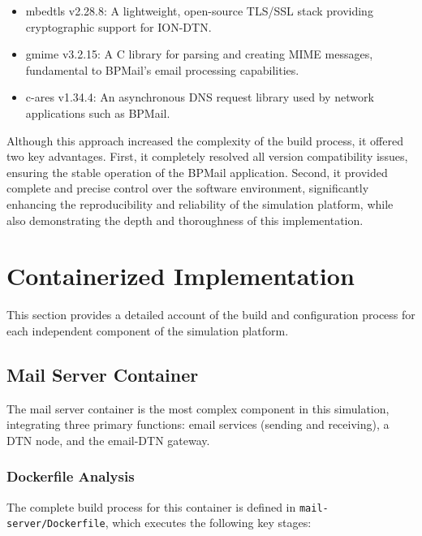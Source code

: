 \begin{itemize}
    \item mbedtls v2.28.8: A lightweight, open-source TLS/SSL stack providing cryptographic support for ION-DTN.
    \item gmime v3.2.15: A C library for parsing and creating MIME messages, fundamental to BPMail's email processing capabilities.
    \item c-ares v1.34.4: An asynchronous DNS request library used by network applications such as BPMail.
\end{itemize}

Although this approach increased the complexity of the build process, it offered two key advantages. First, it completely resolved all version compatibility issues, ensuring the stable operation of the BPMail application. Second, it provided complete and precise control over the software environment, significantly enhancing the reproducibility and reliability of the simulation platform, while also demonstrating the depth and thoroughness of this implementation.

\section{Containerized Implementation}
This section provides a detailed account of the build and configuration process for each independent component of the simulation platform.

\subsection{Mail Server Container}

The mail server container is the most complex component in this simulation, integrating three primary functions: email services (sending and receiving), a DTN node, and the email-DTN gateway.

\subsubsection*{Dockerfile Analysis}

The complete build process for this container is defined in \texttt{mail-server/Dockerfile}, which executes the following key stages:

